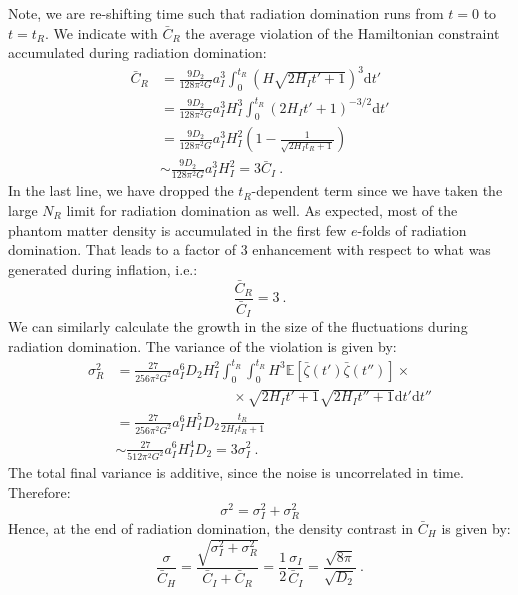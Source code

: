 \documentclass[amsmath,amssymb,11pt]{article}
\begin{document}
Note, we are re-shifting time such that radiation domination runs from $t=0$ to $t=t_R$. We indicate with $\bar{ C}_{R}$ the average violation of the Hamiltonian constraint accumulated during radiation domination:
\begin{equation}
\begin{split}
    \bar{C}_R&= \frac{9 D_2}{128 \pi^2 G}a_I^3 \int_{0}^{t_R} \left( H  \sqrt{2 H_I t' + 1} \right)^3  \text{d}t'\\
    & = \frac{9 D_2}{128 \pi^2 G}a_I^3 H_I^3 \int_{0}^{t_R} \left(2 H_I t' + 1\right)^{-3/2}  \text{d}t'\\
    & = \frac{9 D_2}{128 \pi^2 G}a_I^3 H_I^2 \left(1- \frac{1}{\sqrt{2 H_I t_R +1}} \right) \\
    & \sim  \frac{9 D_2}{128 \pi^2 G}a_I^3 H_I^2 = 3 \bar{ C}_I \ .
\end{split}
\end{equation}
In the last line, we have dropped the $t_R$-dependent term since we have taken the large $N_R$ limit for radiation domination as well. As expected, most of the phantom matter density is accumulated in the first few $e$-folds of radiation domination. That leads to a factor of 3 enhancement with respect to what was generated during inflation, i.e.:
\begin{equation}
    \frac{\bar{C}_R}{\bar{C}_I } = 3 \ .
\end{equation}
We can similarly calculate the growth in the size of the fluctuations during radiation domination. The variance of the violation is given by:
\begin{equation}
\begin{split}
    \sigma^2_R &= \frac{27}{256\pi^2 G^2}a_I^6 D_2 H_I^2\int_0^{t_R}  \int_0^{t_R} H^3 \mathbb{E}[ \bar{\zeta}(t') \bar{\zeta}(t'') ] \times \\
    & \hspace{100pt} \times  \sqrt{2H_I t'+1}\sqrt{2H_I t''+1} \text{d}t' \text{d}t'' \\
    & = \frac{27}{256\pi^2 G^2} a_I^6 H_I^5 D_2  \frac{t_R}{2H_I t_R + 1} \\
    & \sim \frac{27}{512\pi^2 G^2} a_I^6 H_I^4 D_2 = 3\sigma^2_I \ .
\end{split}
\end{equation}
The total final variance is additive, since the noise is uncorrelated in time. Therefore:
\begin{equation}
    \sigma^2 = \sigma^2_I + \sigma^2_R
\end{equation}
Hence, at the end of radiation domination, the density contrast in $\bar{C}_H $ is given by:
\begin{equation}
\label{eq:after_rad}
    \frac{\sigma}{\bar{C}_H } = \frac{\sqrt{\sigma_I^2 + \sigma^2_R}}{\bar{C}_I + \bar{C}_R} = \frac{1}{2} \frac{\sigma_I}{\bar{C}_I} = \frac{\sqrt{8\pi}}{\sqrt{ D_2}} \ .
\end{equation}
\end{document}
